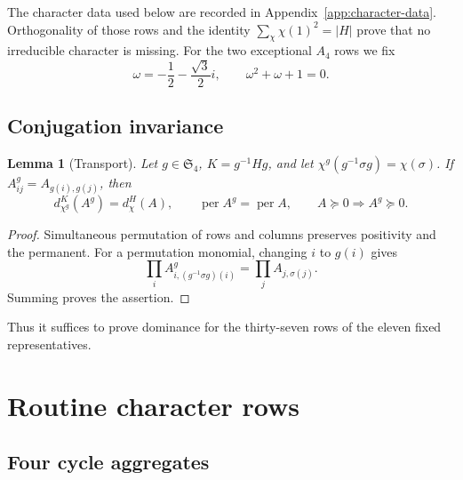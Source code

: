 \documentclass[11pt]{article}
\newtheorem{lemma}[theorem]{Lemma}
\theoremstyle{definition}
\newcommand{\Sn}{\mathfrak S}
\newcommand{\per}{\operatorname{per}}
\newcommand{\psd}{\succeq 0}
\begin{document}
The character data used below are recorded in
Appendix~\ref{app:character-data}.  Orthogonality of those rows and the
identity $\sum_\chi\chi(1)^2=|H|$ prove that no irreducible character is
missing.  For the two exceptional $A_4$ rows we fix
\begin{equation}\label{eq:omega}
 \omega=-\frac12-\frac{\sqrt3}{2}i,
 \qquad \omega^2+\omega+1=0.
\end{equation}

\subsection{Conjugation invariance}

\begin{lemma}[Transport]\label{lem:transport}
Let $g\in\Sn_4$, $K=g^{-1}Hg$, and let
$\chi^g(g^{-1}\sigma g)=\chi(\sigma)$.  If
$A^g_{ij}=A_{g(i),g(j)}$, then
\[
 d_{\chi^g}^{K}(A^g)=d_\chi^H(A),\qquad \per A^g=\per A,
 \qquad A\psd\Longrightarrow A^g\psd.
\]
\end{lemma}

\begin{proof}
Simultaneous permutation of rows and columns preserves positivity and the
permanent.  For a permutation monomial, changing $i$ to $g(i)$ gives
\[
 \prod_i A^g_{i,(g^{-1}\sigma g)(i)}
 =\prod_j A_{j,\sigma(j)}.
\]
Summing proves the assertion.
\end{proof}

Thus it suffices to prove dominance for the thirty-seven rows of the eleven
fixed representatives.

\section{Routine character rows}\label{sec:routine-rows}

\subsection{Four cycle aggregates}
\end{document}
